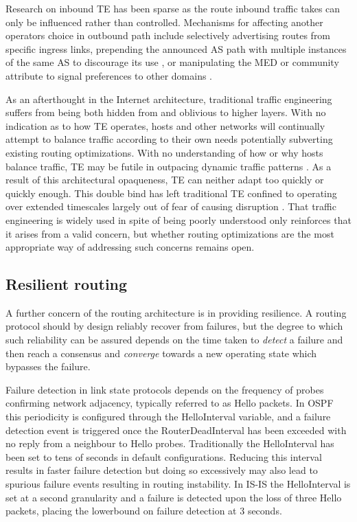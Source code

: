 Research on inbound \ac{TE} has been sparse as the route inbound traffic takes can only be influenced rather than controlled.
Mechanisms for affecting another operators choice in outbound path include selectively advertising routes from specific ingress links, prepending the announced \ac{AS} path with multiple instances of the same \ac{AS} to discourage its use \cite{Chang:2005p513}, or manipulating the \ac{MED} or community attribute to signal preferences to other domains \cite{Quoitin:2004p512}.


As an afterthought in the Internet architecture, traditional traffic engineering suffers from being both hidden from and oblivious to higher layers.
With no indication as to how \ac{TE} operates, hosts and other networks will continually attempt to balance traffic according to their own needs potentially subverting existing routing optimizations.
With no understanding of how or why hosts balance traffic, \ac{TE} may be futile in outpacing dynamic traffic patterns \cite{He:2006p504}.
As a result of this architectural opaqueness, \ac{TE} can neither adapt too quickly or quickly enough.
This double bind has left traditional \ac{TE} confined to operating over extended timescales largely out of fear of causing disruption \cite{Labovitz:1998p505}.
That traffic engineering is widely used in spite of being poorly understood only reinforces that it arises from a valid concern, but whether routing optimizations are the most appropriate way of addressing such concerns remains open.


\subsection{Resilient routing}

A further concern of the routing architecture is in providing resilience.
A routing protocol should by design reliably recover from failures, but the degree to which such reliability can be assured depends on the time taken to \emph{detect} a failure and then reach a consensus and \emph{converge} towards a new operating state which bypasses the failure.

Failure detection in link state protocols depends on the frequency of probes confirming network adjacency, typically referred to as Hello packets.
In \ac{OSPF} this periodicity is configured through the HelloInterval variable, and a failure detection event is triggered once the RouterDeadInterval has been exceeded with no reply from a neighbour to Hello probes.
Traditionally the HelloInterval has been set to tens of seconds in default configurations.
Reducing this interval results in faster failure detection \cite{Goyal:2003p515} but doing so excessively may also lead to spurious failure events resulting in routing instability.
In \ac{IS-IS} the HelloInterval is set at a second granularity and a failure is detected upon the loss of three Hello packets, placing the lowerbound on failure detection at 3 seconds.

